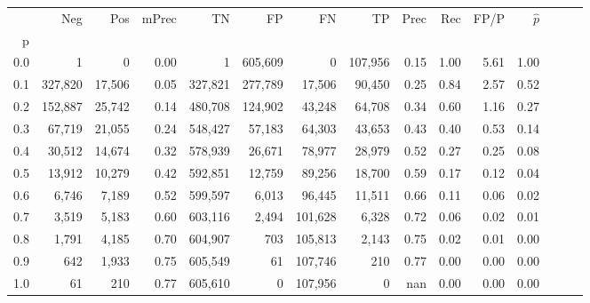 \begin{tabular}{rrrrrrrrrrrrrrr}
\toprule
{} &      Neg &     Pos & mPrec &       TN &       FP &       FN &       TP &  Prec &   Rec &  FP/P & $\hat{p}$ \\
p   &          &         &       &          &          &          &          &       &       &       &           \\
\midrule
0.0 &        1 &       0 &  0.00 &        1 &  605,609 &        0 &  107,956 &  0.15 &  1.00 &  5.61 &      1.00 \\
0.1 &  327,820 &  17,506 &  0.05 &  327,821 &  277,789 &   17,506 &   90,450 &  0.25 &  0.84 &  2.57 &      0.52 \\
0.2 &  152,887 &  25,742 &  0.14 &  480,708 &  124,902 &   43,248 &   64,708 &  0.34 &  0.60 &  1.16 &      0.27 \\
0.3 &   67,719 &  21,055 &  0.24 &  548,427 &   57,183 &   64,303 &   43,653 &  0.43 &  0.40 &  0.53 &      0.14 \\
0.4 &   30,512 &  14,674 &  0.32 &  578,939 &   26,671 &   78,977 &   28,979 &  0.52 &  0.27 &  0.25 &      0.08 \\
0.5 &   13,912 &  10,279 &  0.42 &  592,851 &   12,759 &   89,256 &   18,700 &  0.59 &  0.17 &  0.12 &      0.04 \\
0.6 &    6,746 &   7,189 &  0.52 &  599,597 &    6,013 &   96,445 &   11,511 &  0.66 &  0.11 &  0.06 &      0.02 \\
0.7 &    3,519 &   5,183 &  0.60 &  603,116 &    2,494 &  101,628 &    6,328 &  0.72 &  0.06 &  0.02 &      0.01 \\
0.8 &    1,791 &   4,185 &  0.70 &  604,907 &      703 &  105,813 &    2,143 &  0.75 &  0.02 &  0.01 &      0.00 \\
0.9 &      642 &   1,933 &  0.75 &  605,549 &       61 &  107,746 &      210 &  0.77 &  0.00 &  0.00 &      0.00 \\
1.0 &       61 &     210 &  0.77 &  605,610 &        0 &  107,956 &        0 &   nan &  0.00 &  0.00 &      0.00 \\
\bottomrule
\end{tabular}
